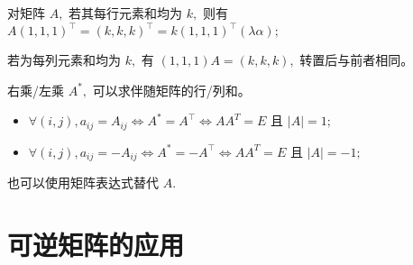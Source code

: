 
对矩阵 $ A, $ 若其每行元素和均为 $ k, $ 则有 $ A(1,1,1)^\top = (k,k,k)^\top = k(1,1,1)^\top(\lambda \alpha); $

若为每列元素和均为 $ k, $ 有 $ (1,1,1)A = (k,k,k), $ 转置后与前者相同。

右乘/左乘 $ A^*, $ 可以求伴随矩阵的行/列和。


\begin{itemize}
    \item $ \forall (i,j), a_{ij} = A_{ij} \Leftrightarrow A^* = A^\top \Leftrightarrow AA^T = E $
    且 $ |A| = 1; $ 
    \item $ \forall (i,j), a_{ij} = -A_{ij} \Leftrightarrow A^* = -A^\top \Leftrightarrow AA^T = E $
    且 $ |A| = -1; $ 
\end{itemize}

也可以使用矩阵表达式替代 $ A. $

\section{可逆矩阵的应用}

